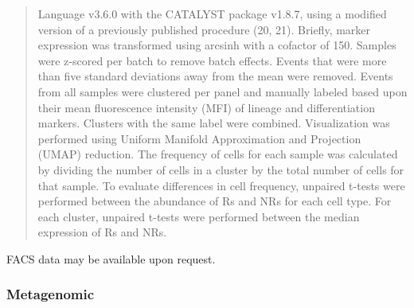 \documentclass[
]{article}
\begin{document}
\begin{quote}
Language v3.6.0 with the CATALYST package v1.8.7, using a modified
version of a previously published procedure (20, 21). Briefly, marker
expression was transformed using arcsinh with a cofactor of 150. Samples
were z-scored per batch to remove batch effects. Events that were more
than five standard deviations away from the mean were removed. Events
from all samples were clustered per panel and manually labeled based
upon their mean fluorescence intensity (MFI) of lineage and
differentiation markers. Clusters with the same label were combined.
Visualization was performed using Uniform Manifold Approximation and
Projection (UMAP) reduction. The frequency of cells for each sample was
calculated by dividing the number of cells in a cluster by the total
number of cells for that sample. To evaluate differences in cell
frequency, unpaired t-tests were performed between the abundance of Rs
and NRs for each cell type. For each cluster, unpaired t-tests were
performed between the median expression of Rs and NRs.
\end{quote}

FACS data may be available upon request.

\hypertarget{metagenomic}{%
\subsubsection{Metagenomic}\label{metagenomic}}
\end{document}
